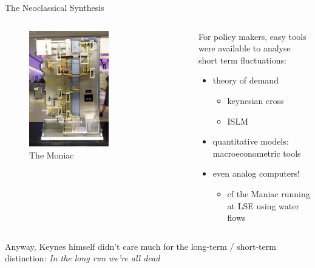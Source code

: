 \begin{frame}{The Neoclassical Synthesis}
\protect\hypertarget{the-neoclassical-synthesis-1}{}
\begin{columns}[T]
\begin{column}{0.48\textwidth}
\begin{figure}
\centering
\includegraphics[width=0.6\textwidth,height=\textheight]{assets/moniac.jpg}
\caption{The Moniac}
\end{figure}
\end{column}

\begin{column}{0.48\textwidth}
For policy makers, easy tools were available to analyse short term
fluctuations:

\begin{itemize}
\tightlist
\item
  theory of demand

  \begin{itemize}
  \tightlist
  \item
    keynesian cross
  \item
    ISLM
  \end{itemize}
\item
  quantitative models: macroeconometric tools
\item
  even analog computers!

  \begin{itemize}
  \tightlist
  \item
    cf the Maniac running at LSE using water flows
  \end{itemize}
\end{itemize}
\end{column}
\end{columns}

\pause

Anyway, Keynes himself didn't care much for the long-term / short-term
distinction: \emph{In the long run we're all dead}
\end{frame}

